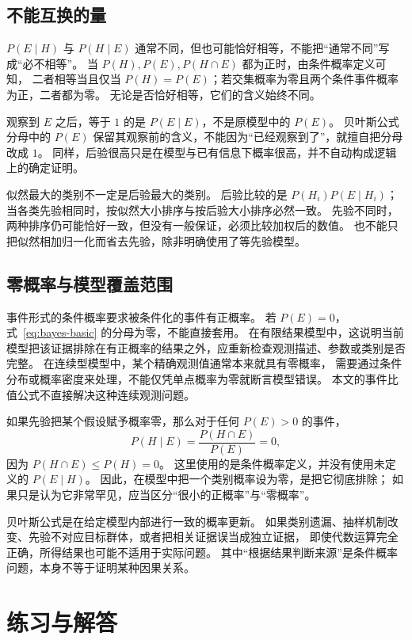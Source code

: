 \documentclass[UTF8,12pt,a4paper,fontset=fandol]{ctexart}
\begin{document}
\subsection{不能互换的量}

$P(E\mid H)$ 与 $P(H\mid E)$ 通常不同，但也可能恰好相等，不能把“通常不同”写成“必不相等”。
当 $P(H),P(E),P(H\cap E)$ 都为正时，由条件概率定义可知，
二者相等当且仅当 $P(H)=P(E)$；若交集概率为零且两个条件事件概率为正，二者都为零。
无论是否恰好相等，它们的含义始终不同。

观察到 $E$ 之后，等于 $1$ 的是 $P(E\mid E)$，不是原模型中的 $P(E)$。
贝叶斯公式分母中的 $P(E)$ 保留其观察前的含义，不能因为“已经观察到了”，就擅自把分母改成 $1$。
同样，后验很高只是在模型与已有信息下概率很高，并不自动构成逻辑上的确定证明。

似然最大的类别不一定是后验最大的类别。
后验比较的是 $P(H_i)P(E\mid H_i)$；当各类先验相同时，按似然大小排序与按后验大小排序必然一致。
先验不同时，两种排序仍可能恰好一致，但没有一般保证，必须比较加权后的数值。
也不能只把似然相加归一化而省去先验，除非明确使用了等先验模型。

\subsection{零概率与模型覆盖范围}

事件形式的条件概率要求被条件化的事件有正概率。
若 $P(E)=0$，式~\eqref{eq:bayes-basic} 的分母为零，不能直接套用。
在有限结果模型中，这说明当前模型把该证据排除在有正概率的结果之外，应重新检查观测描述、参数或类别是否完整。
在连续型模型中，某个精确观测值通常本来就具有零概率，
需要通过条件分布或概率密度来处理，不能仅凭单点概率为零就断言模型错误。
本文的事件比值公式不直接解决这种连续观测问题。

如果先验把某个假设赋予概率零，那么对于任何 $P(E)>0$ 的事件，
\[
  P(H\mid E)=\frac{P(H\cap E)}{P(E)}=0,
\]
因为 $P(H\cap E)\leq P(H)=0$。
这里使用的是条件概率定义，并没有使用未定义的 $P(E\mid H)$。
因此，在模型中把一个类别概率设为零，是把它彻底排除；
如果只是认为它非常罕见，应当区分“很小的正概率”与“零概率”。

贝叶斯公式是在给定模型内部进行一致的概率更新。
如果类别遗漏、抽样机制改变、先验不对应目标群体，或者把相关证据误当成独立证据，
即使代数运算完全正确，所得结果也可能不适用于实际问题。
其中“根据结果判断来源”是条件概率问题，本身不等于证明某种因果关系。

\section{练习与解答}
\label{sec:bayes-exercises}
\end{document}
